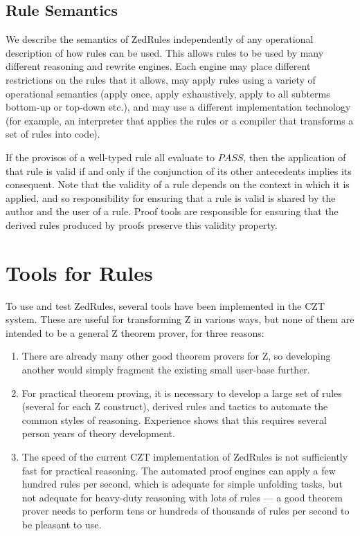 \documentclass{entcs}
\begin{document}
\subsection{Rule Semantics}

We describe the semantics of ZedRules independently of any operational
description of how rules can be used.  This allows rules to be used by
many different reasoning and rewrite engines.  Each engine may place
different restrictions on the rules that it allows, may apply rules
using a variety of operational semantics (apply once, apply
exhaustively, apply to all subterms bottom-up or top-down etc.), and
may use a different implementation technology (for example, an
interpreter that applies the rules or a compiler that transforms a set
of rules into code).

If the provisos of a well-typed rule all evaluate to $PASS$, then the
application of that rule is valid if and only if the conjunction of
its other antecedents implies its consequent.  Note that the validity
of a rule depends on the context in which it is applied, and so
responsibility for ensuring that a rule is valid is shared by the
author and the user of a rule.  Proof tools are responsible for
ensuring that the derived rules produced by proofs preserve this
validity property.


\section{Tools for Rules} \label{sec:tools}

To use and test ZedRules, several tools have been implemented in the
CZT system.  These are useful for transforming Z in various ways, but
none of them are intended to be a general Z theorem prover, for three
reasons:
\begin{enumerate}
\item There are already many other good theorem provers for Z, so
  developing another would simply fragment the existing small
  user-base further.
\item For practical theorem proving, it is necessary to develop a
  large set of rules (several for each Z construct), derived rules and
  tactics to automate the common styles of reasoning.  Experience
  shows that this requires several person years of theory development.
\item The speed of the current CZT implementation of ZedRules is not
  sufficiently fast for practical reasoning.  The automated proof
  engines can apply a few hundred rules per second, which is adequate
  for simple unfolding tasks, but not adequate for heavy-duty
  reasoning with lots of rules --- a good theorem prover needs to
  perform tens or hundreds of thousands of rules per second to be
  pleasant to use.
\end{enumerate}
\end{document}
